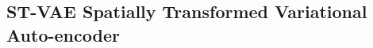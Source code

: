 














\subsection{{\bf ST-VAE} Spatially Transformed Variational Auto-encoder}\label{sec:stvae}


